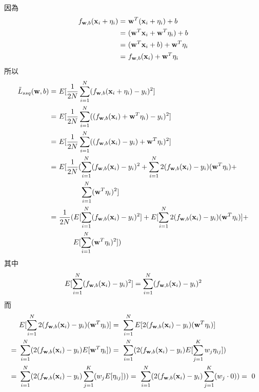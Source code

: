 \documentclass{article}
\begin{document}
\noindent
因為
\begin{align*}
    f_{{\bf w}, b}({\bf x}_i + {\bf \eta}_i) =\ &{\bf w}^T({\bf x}_i + {\bf \eta}_i) + b\\
    =\ &({\bf w}^T {\bf x}_i + {\bf w}^T {\bf \eta}_i) + b\\
    =\ &({\bf w}^T {\bf x}_i + b) + {\bf w}^T {\bf \eta}_i\\
    =\ &f_{{\bf w}, b}({\bf x}_i) + {\bf w}^T {\bf \eta}_i
\end{align*}
所以
\begin{align*}
    \tilde{L}_{ssq}({\bf w}, b) =\ &E[\frac{1}{2N} \sum_{i = 1}^{N} (f_{{\bf w}, b} ({\bf x}_i + {\bf \eta}_i) - y_i)^2]\\
    =\ &E[\frac{1}{2N} \sum_{i = 1}^{N} ((f_{{\bf w}, b} ({\bf x}_i) + {\bf w}^T {\bf \eta}_i) - y_i)^2]\\
    =\ &E[\frac{1}{2N} \sum_{i = 1}^{N} ((f_{{\bf w}, b} ({\bf x}_i) - y_i) + {\bf w}^T {\bf \eta}_i)^2]\\
    =\ &E[\frac{1}{2N} (\sum_{i = 1}^{N} (f_{{\bf w}, b} ({\bf x}_i) - y_i)^2 + \sum_{i = 1}^{N} 2(f_{{\bf w}, b} ({\bf x}_i) - y_i)({\bf w}^T {\bf \eta}_i) +\\
    &\ \ \ \ \ \ \ \ \ \sum_{i = 1}^{N} ({\bf w}^T {\bf \eta}_i)^2]\\
    =\ &\frac{1}{2N} (E[\sum_{i = 1}^{N} (f_{{\bf w}, b} ({\bf x}_i) - y_i)^2] + E[\sum_{i = 1}^{N} 2(f_{{\bf w}, b} ({\bf x}_i) - y_i)({\bf w}^T {\bf \eta}_i)] +\\
    &\ \ \ \ \ \ E[\sum_{i = 1}^{N} ({\bf w}^T {\bf \eta}_i)^2])
\end{align*}
其中
\begin{align*}
    E[\sum_{i = 1}^{N} (f_{{\bf w}, b} ({\bf x}_i) - y_i)^2] = \sum_{i = 1}^{N} (f_{{\bf w}, b} ({\bf x}_i) - y_i)^2
\end{align*}
而
\begin{align*}
    &E[\sum_{i = 1}^{N} 2(f_{{\bf w}, b} ({\bf x}_i) - y_i)({\bf w}^T {\bf \eta}_i)]
    =\ \sum_{i = 1}^{N} E[2(f_{{\bf w}, b} ({\bf x}_i) - y_i)({\bf w}^T {\bf \eta}_i)]\\
    =\ &\sum_{i = 1}^{N} (2(f_{{\bf w}, b} ({\bf x}_i) - y_i)E[{\bf w}^T {\bf \eta}_i])
    =\ \sum_{i = 1}^{N} (2(f_{{\bf w}, b} ({\bf x}_i) - y_i)E[\sum_{j = 1}^{K} w_j \eta_{ij}])\\
    =\ &\sum_{i = 1}^{N} (2(f_{{\bf w}, b} ({\bf x}_i) - y_i) \sum_{j = 1}^{K} (w_j E[\eta_{ij}]))
    =\ \sum_{i = 1}^{N} (2(f_{{\bf w}, b} ({\bf x}_i) - y_i) \sum_{j = 1}^{K} (w_j \cdot 0))
    =\ 0
\end{align*}
\end{document}
